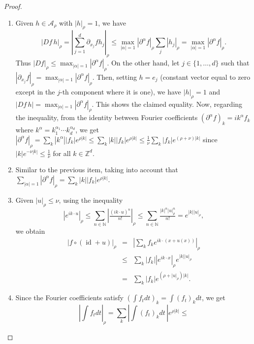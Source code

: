 \documentclass[12pt,reqno,a4paper]{amsart}%
\numberwithin{equation}{section}
\newcommand{\A}{{\mathcal A}}
\newcommand{\Zz}{{\mathbb{Z}}}
\newcommand{\id}  {\operatorname{id}}
\begin{document}
\begin{proof}
\hfill
\begin{enumerate}
\item Given $h\in\A_\rho$ with $|h|_\rho=1$, we have 
$$
|Df\,h|_\rho = |\sum_{j=1}^d\partial_{x_j}f  h_j|_\rho\leq \max_{|\alpha|=1}|\partial^\alpha f|_\rho \sum_j|h_j|_\rho = \max_{|\alpha|=1}|\partial^\alpha f|_\rho.
$$ 
Thus $|Df|_\rho\leq \max_{|\alpha|=1}|\partial^\alpha f|_\rho$. On the other hand, let $j\in\{1,\ldots, d\}$ such that $|\partial_{x_j}f|_\rho = \max_{|\alpha|=1}|\partial^\alpha f|_\rho$. Then, setting $h=e_j$ (constant vector equal to zero except in the $j$-th component where it is one), we have $|h|_\rho = 1$ and $|Df\,h|=\max_{|\alpha|=1}|\partial^\alpha f|_\rho$.  This shows the claimed equality. Now, regarding the inequality, from the identity between Fourier coefficients $(\partial^\alpha f)_k =i k^\alpha f_k$ where $k^\alpha=k_1^{\alpha_1}\cdots k_d^{\alpha_d}$, we get $|\partial^\alpha f|_\rho = \sum_k|k^\alpha||f_k|e^{\rho|k|}\leq \sum_k|k||f_k|e^{\rho|k|}\leq\frac{1}{\nu}\sum_k|f_k|e^{(\rho+\nu)|k|}$ since $|k|e^{-\nu|k|}\leq \frac{1}{\nu}$ for all $k\in\Zz^d$.
\item Similar to the previous item, taking into account that $\sum_{|\alpha|=1}|\partial^\alpha f|_\rho = \sum_k|k||f_k|e^{\rho|k|}$. 
\item Given $|u|_\rho\leq \nu$, using the inequality 
$$
|e^{ik\cdot u}|_{\rho}\leq \sum_{n\in\mathbb N}|\tfrac{(ik\cdot u)^n}{n!}|_{\rho}\leq\sum_{n\in\mathbb N}\tfrac{|k|^n|u|_{\rho}^n}{n!}=e^{|k||u|_{\rho}},
$$ 
we obtain
\begin{eqnarray*}
|f\circ(\id+u)|_\rho 
&=& 
\left|\sum_kf_ke^{ik\cdot(x+u(x))}\right|_\rho \\
&\leq & 
\sum_k|f_k||e^{ik\cdot x}|_\rho e^{|k||u|_\rho} \\
&=& 
\sum_k|f_k|e^{(\rho + |u|_\rho)|k|}.
\end{eqnarray*}
\item Since the Fourier coefficients satisfy $(\int f_tdt)_k = \int (f_t)_k dt $, we get
$$
\left|\int f_t dt\right|_\rho =\sum_k \left|\int (f_t)_k dt\,\right| e^{\rho|k|}\leq
$$
\end{enumerate}
\end{proof}
\end{document}

